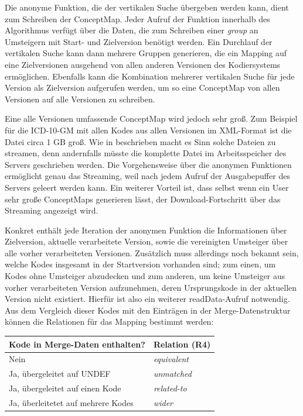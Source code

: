 Die anonyme Funktion, die der vertikalen Suche übergeben werden kann, dient zum Schreiben der ConceptMap. Jeder Aufruf der Funktion innerhalb des Algorithmus verfügt über die Daten, die zum Schreiben einer \emph{group} an Umsteigern mit Start- und Zielversion benötigt werden. Ein Durchlauf der vertikalen Suche kann dann mehrere Gruppen generieren, die ein Mapping auf eine Zielversionen ausgehend von allen anderen Versionen des Kodiersystems ermöglichen. Ebenfalls kann die Kombination mehrerer vertikalen Suche für jede Version als Zielversion aufgerufen werden, um so eine ConceptMap von allen Versionen auf alle Versionen zu schreiben.

Eine alle Versionen umfassende ConceptMap wird jedoch sehr groß. Zum Beispiel für die ICD-10-GM mit allen Kodes aus allen Versionen im XML-Format ist die Datei circa 1 GB groß. Wie in \cite{braaksma2014streaming} beschrieben macht es Sinn solche Dateien zu streamen, denn andernfalls müsste die komplette Datei im Arbeitsspeicher des Servers geschrieben werden. Die Vorgehensweise über die anonymen Funktionen ermöglicht genau das Streaming, weil nach jedem Aufruf der Ausgabepuffer des Servers geleert werden kann. Ein weiterer Vorteil ist, dass selbst wenn ein User sehr große ConceptMaps generieren lässt, der Download-Fortschritt über das Streaming angezeigt wird.  

Konkret enthält jede Iteration der anonymen Funktion die Informationen über Zielversion, aktuelle verarbeitete Version, sowie die vereinigten Umsteiger über alle vorher verarbeiteten Versionen. Zusätzlich muss allerdings noch bekannt sein, welche Kodes insgesamt in der Startversion vorhanden sind; zum einen, um Kodes ohne Umsteiger abzudecken und zum anderen, um keine Umsteiger aus vorher verarbeiteten Version aufzunehmen, deren Ursprungskode in der aktuellen Version nicht existiert. Hierfür ist also ein weiterer readData-Aufruf notwendig. Aus dem Vergleich dieser Kodes mit den Einträgen in der Merge-Datenstruktur können die Relationen für das Mapping bestimmt werden:

{
\renewcommand{\arraystretch}{1.2}
\begin{tabular}{ll}
Kode in Merge-Daten enthalten? & Relation (R4) \\
\hline
Nein & \emph{equivalent} \\
Ja, übergeleitet auf UNDEF & \emph{unmatched} \\
Ja, übergeleitet auf einen Kode & \emph{related-to} \\
Ja, überleitetet auf mehrere Kodes & \emph{wider} \\
\end{tabular}
}

